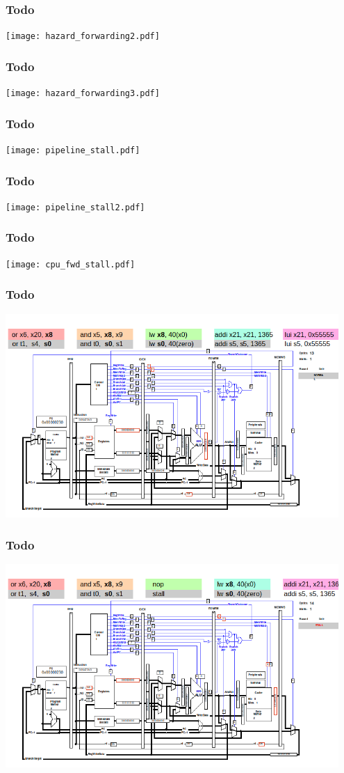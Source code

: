 \documentclass{beamer}
\begin{document}
\begin{frame}
\frametitle{Todo}
\texttt{[image: hazard\_forwarding2.pdf]}
\end{frame}

\begin{frame}
\frametitle{Todo}
\texttt{[image: hazard\_forwarding3.pdf]}
\end{frame}

\begin{frame}
\frametitle{Todo}
\texttt{[image: pipeline\_stall.pdf]}
\end{frame}

\begin{frame}
\frametitle{Todo}
\texttt{[image: pipeline\_stall2.pdf]}
\end{frame}

\begin{frame}
\frametitle{Todo}
\texttt{[image: cpu\_fwd\_stall.pdf]}
\end{frame}

\begin{frame}
\frametitle{Todo}
\includegraphics[width=0.95\textwidth]{fig/hazard-stall-qtrvsim2.png}
\end{frame}

\begin{frame}
\frametitle{Todo}
\includegraphics[width=0.95\textwidth]{fig/hazard-stall-qtrvsim3.png}
\end{frame}
\end{document}
